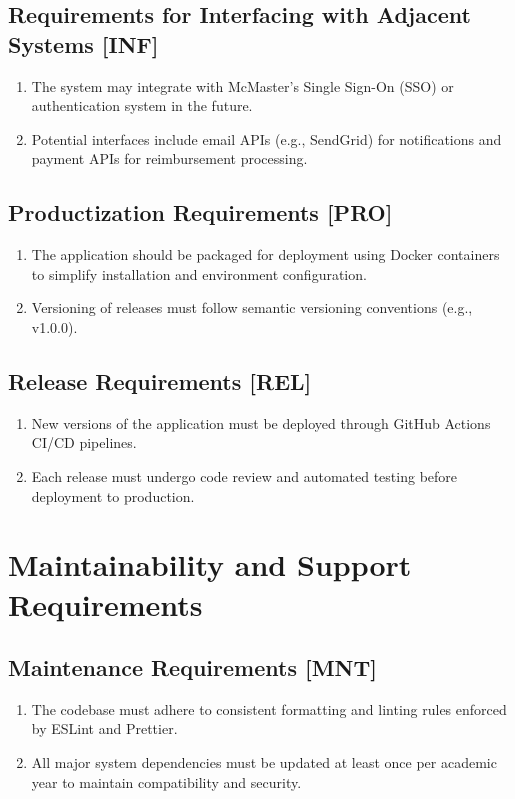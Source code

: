 \documentclass[12pt]{article}
\begin{document}
  \subsection{Requirements for Interfacing with Adjacent Systems [INF]}
    \begin{enumerate}
      \item The system may integrate with McMaster's Single Sign-On (SSO) or authentication system in the future.
      \item Potential interfaces include email APIs (e.g., SendGrid) for notifications and payment APIs for reimbursement processing.
    \end{enumerate}

  \subsection{Productization Requirements [PRO]}
    \begin{enumerate}
      \item The application should be packaged for deployment using Docker containers to simplify installation and environment configuration.
      \item Versioning of releases must follow semantic versioning conventions (e.g., v1.0.0).
    \end{enumerate}

  \subsection{Release Requirements [REL]}
    \begin{enumerate}
      \item New versions of the application must be deployed through GitHub Actions CI/CD pipelines.
      \item Each release must undergo code review and automated testing before deployment to production.
    \end{enumerate}

\section{Maintainability and Support Requirements}

\subsection{Maintenance Requirements [MNT]}
\begin{enumerate}
    \item The codebase must adhere to consistent formatting and linting rules enforced by ESLint and Prettier.
    \item All major system dependencies must be updated at least once per academic year to maintain compatibility and security.
\end{enumerate}
\end{document}
